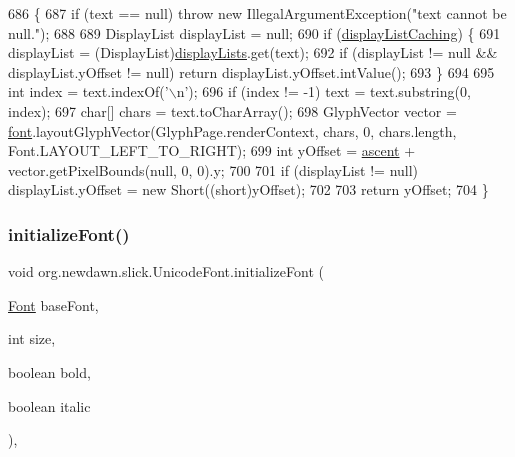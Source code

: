 \begin{DoxyCode}
686                                         \{
687         \textcolor{keywordflow}{if} (text == null) \textcolor{keywordflow}{throw} \textcolor{keyword}{new} IllegalArgumentException(\textcolor{stringliteral}{"text cannot be null."});
688 
689         DisplayList displayList = null;
690         \textcolor{keywordflow}{if} (\mbox{\hyperlink{classorg_1_1newdawn_1_1slick_1_1_unicode_font_aad1040617fd0167c54d6dd3511c6bd48}{displayListCaching}}) \{
691             displayList = (DisplayList)\mbox{\hyperlink{classorg_1_1newdawn_1_1slick_1_1_unicode_font_a66750034039374bef370150798d64f95}{displayLists}}.get(text);
692             \textcolor{keywordflow}{if} (displayList != null && displayList.yOffset != null) \textcolor{keywordflow}{return} displayList.yOffset.intValue();
693         \}
694 
695         \textcolor{keywordtype}{int} index = text.indexOf(\textcolor{charliteral}{'\(\backslash\)n'});
696         \textcolor{keywordflow}{if} (index != -1) text = text.substring(0, index);
697         \textcolor{keywordtype}{char}[] chars = text.toCharArray();
698         GlyphVector vector = \mbox{\hyperlink{classorg_1_1newdawn_1_1slick_1_1_unicode_font_a956ab491839be375d47444a67ebff11c}{font}}.layoutGlyphVector(GlyphPage.renderContext, chars, 0, chars.length, 
      Font.LAYOUT\_LEFT\_TO\_RIGHT);
699         \textcolor{keywordtype}{int} yOffset = \mbox{\hyperlink{classorg_1_1newdawn_1_1slick_1_1_unicode_font_a195706fa1491e793a4b923dd844b594f}{ascent}} + vector.getPixelBounds(null, 0, 0).y;
700 
701         \textcolor{keywordflow}{if} (displayList != null) displayList.yOffset = \textcolor{keyword}{new} Short((\textcolor{keywordtype}{short})yOffset);
702 
703         \textcolor{keywordflow}{return} yOffset;
704     \}
\end{DoxyCode}
\mbox{\label{classorg_1_1newdawn_1_1slick_1_1_unicode_font_a50d0619aea65cc8ebdc66a2d7c63aede}} 
\subsubsection{\texorpdfstring{initialize\+Font()}{initializeFont()}}
{\footnotesize\ttfamily void org.\+newdawn.\+slick.\+Unicode\+Font.\+initialize\+Font (\begin{DoxyParamCaption}\item[{\mbox{\hyperlink{interfaceorg_1_1newdawn_1_1slick_1_1_font}{Font}}}]{base\+Font,  }\item[{int}]{size,  }\item[{boolean}]{bold,  }\item[{boolean}]{italic }\end{DoxyParamCaption})\hspace{0.3cm}{\ttfamily [inline]}, {\ttfamily [private]}}

